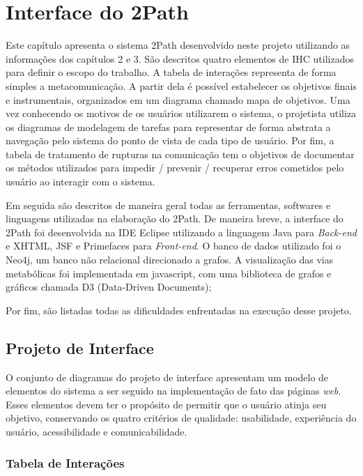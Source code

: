 \chapter{Interface do 2Path}

\indent Este capítulo apresenta o sistema 2Path desenvolvido neste projeto utilizando as informações dos capítulos 2 e 3. São descritos quatro elementos de IHC utilizados para definir o escopo do trabalho. A tabela de interações representa de forma simples a metacomunicação. A partir dela é possível estabelecer os objetivos finais e instrumentais, organizados em um diagrama chamado mapa de objetivos. Uma vez conhecendo os motivos de os usuários utilizarem o sistema, o projetista utiliza os diagramas de modelagem de tarefas para representar de forma abstrata a navegação pelo sistema do ponto de vista de cada tipo de usuário. Por fim, a tabela de tratamento de rupturas na comunicação tem o objetivos de documentar os métodos utilizados para impedir / prevenir / recuperar erros cometidos pelo usuário ao interagir com o sistema.

\indent Em seguida são descritos de maneira geral todas as ferramentas, softwares e linguagens utilizadas na elaboração do 2Path. De maneira breve, a interface do 2Path foi desenvolvida na IDE Eclipse utilizando a linguagem Java para \textit{Back-end} e XHTML, JSF e Primefaces para \textit{Front-end}. O banco de dados utilizado foi o Neo4j, um banco não relacional direcionado a grafos. A visualização das vias metabólicas foi implementada em javascript, com uma biblioteca de grafos e gráficos chamada D3 (Data-Driven Documents);

\indent Por fim, são listadas todas as dificuldades enfrentadas na execução desse projeto.

\section{Projeto de Interface}

\indent O conjunto de diagramas do projeto de interface apresentam um modelo de elementos do sistema a ser seguido na implementação de fato das páginas \textit{web}. Esses elementos devem ter o propósito de permitir que o usuário atinja seu objetivo, conservando os quatro critérios de qualidade: usabilidade, experiência do usuário, acessibilidade e comunicabilidade.

\subsection{Tabela de Interações}

